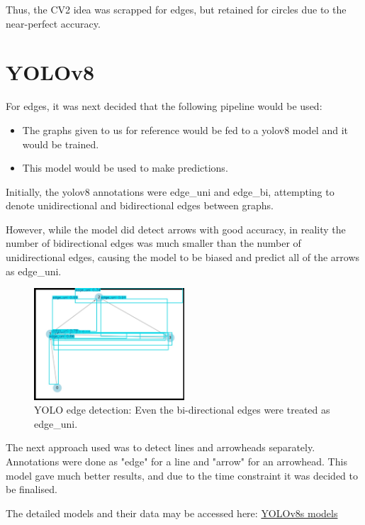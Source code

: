 \documentclass{article}
\begin{document}
Thus, the CV2 idea was scrapped for edges, but retained for circles due to the near-perfect accuracy.

\section{YOLOv8}

For edges, it was next decided that the following pipeline would be used:

\begin{itemize}
    \item The graphs given to us for reference would be fed to a yolov8 model and it would be trained.
    \item This model would be used to make predictions.
\end{itemize}

Initially, the yolov8 annotations were edge\_uni and edge\_bi, attempting to denote unidirectional and bidirectional edges between graphs. 

However, while the model did detect arrows with good accuracy, in reality the number of bidirectional edges was much smaller than the number of unidirectional edges, causing the model to be biased and predict all of the arrows as edge\_uni.

\begin{figure}[h!]
    \centering
    \includegraphics[width=0.5\textwidth]{test.jpg}
    \caption{YOLO edge detection: Even the bi-directional edges were treated as edge\_uni.}
    \label{fig:example}
\end{figure}

The next approach used was to detect lines and arrowheads separately. Annotations were done as "edge" for a line and "arrow" for an arrowhead. This model gave much better results, and due to the time constraint it was decided to be finalised.



The detailed models and their data may be accessed here:
\href{https://drive.google.com/drive/folders/1PqM-U-EIa0wvnxUx_WWJJRzeCGIo2qsN?usp=sharing}{YOLOv8s models}
\end{document}
